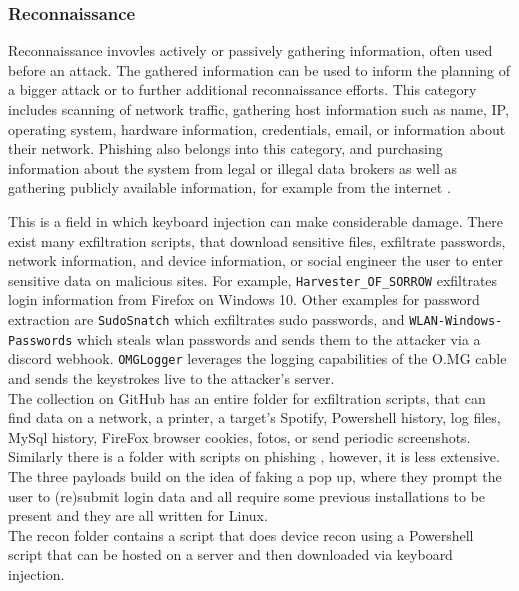 \subsubsection{Reconnaissance}

Reconnaissance invovles actively or passively gathering information, often used before an attack. The gathered information can be used to inform the planning of a bigger attack or to further additional reconnaissance efforts. This category includes scanning of network traffic, gathering host information such as name, IP, operating system, hardware information, credentials, email, or information about their network. Phishing also belongs into this category, and purchasing information about the system from legal or illegal data brokers as well as gathering publicly available information, for example from the internet \cite{MITREATTCK}.

This is a field in which keyboard injection can make considerable damage. There exist many exfiltration scripts, that download sensitive files, exfiltrate passwords, network information, and device information, or social engineer the user to enter sensitive data on malicious sites. 
For example, \verb|Harvester_OF_SORROW| \cite{OmgpayloadsPayloadsLibrary} exfiltrates login information from Firefox on Windows 10. Other examples for password extraction are \verb|SudoSnatch| \cite{OmgpayloadsPayloadsLibrary} which exfiltrates sudo passwords, and \verb|WLAN-Windows-Passwords| \cite{OmgpayloadsPayloadsLibrary}which steals wlan passwords and sends them to the attacker via a discord webhook. 
\verb|OMGLogger| \cite{OmgpayloadsPayloadsLibrary} leverages the logging capabilities of the O.MG cable and sends the keystrokes live to the attacker's server. \\
The collection on GitHub has an entire folder for exfiltration scripts, that can find data on a network, a printer, a target's Spotify, Powershell history, log files, MySql history, FireFox browser cookies, fotos, or send periodic screenshots. \\
Similarly there is a folder with scripts on phishing  \cite{OmgpayloadsPayloadsLibrary}, however, it is less extensive. The three payloads build on the idea of faking a pop up, where they prompt the user to (re)submit login data and all require some previous installations to be present and they are all written for Linux. \\
The recon folder contains a script that does device recon using a Powershell script that can be hosted on a server and then downloaded via keyboard injection. 


